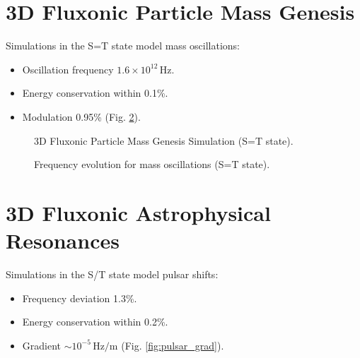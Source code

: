 \documentclass[11pt]{article}
\begin{document}
\section{3D Fluxonic Particle Mass Genesis}
Simulations in the S=T state model mass oscillations:
\begin{itemize}
    \item Oscillation frequency \(1.6 \times 10^{12} \, \text{Hz}\).
    \item Energy conservation within 0.1\%.
    \item Modulation 0.95\% (Fig. \ref{fig:mass_freq}).
\end{itemize}

\begin{figure}[ht]
    \centering
    \caption{3D Fluxonic Particle Mass Genesis Simulation (S=T state).}
    \label{fig:3Dmass}
\end{figure}

\begin{figure}[ht]
    \centering
    \caption{Frequency evolution for mass oscillations (S=T state).}
    \label{fig:mass_freq}
\end{figure}

\section{3D Fluxonic Astrophysical Resonances}
Simulations in the S/T state model pulsar shifts:
\begin{itemize}
    \item Frequency deviation 1.3\%.
    \item Energy conservation within 0.2\%.
    \item Gradient \(\sim 10^{-5} \, \text{Hz/m}\) (Fig. \ref{fig:pulsar_grad}).
\end{itemize}
\end{document}
